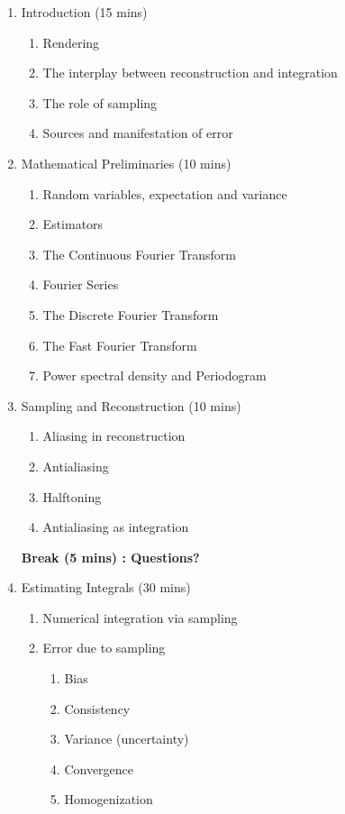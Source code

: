 %
%

\begin{enumerate}
	\item Introduction (15 mins)
	\begin{enumerate}
	\itemsep-0.4em	
		\item Rendering
		\item The interplay between reconstruction and integration
		\item The role of sampling
		\item Sources and manifestation of error
	\end{enumerate}
	\item Mathematical Preliminaries (10 mins) 
	\begin{enumerate}
	\itemsep-0.4em	
		\item Random variables, expectation and variance
		\item Estimators
		\item The Continuous Fourier Transform
		\item Fourier Series
		\item The Discrete Fourier Transform
		\item The Fast Fourier Transform
		\item Power spectral density and Periodogram
	\end{enumerate}
	\item Sampling and Reconstruction (10 mins)
	\begin{enumerate}
	\itemsep-0.4em
		\item Aliasing in reconstruction
		\item Antialiasing
		\item Halftoning
		\item Antialiasing as integration
	\end{enumerate}
	\textbf{Break (5 mins) : Questions?}
	\item Estimating Integrals (30 mins) 
	\begin{enumerate}
	\itemsep-0.4em
		\item Numerical integration via sampling
		\item Error due to sampling
		\begin{enumerate}
		\itemsep-0.6em
			\item Bias
			\item Consistency
			\item Variance (uncertainty)
			\item Convergence
			\item Homogenization

\end{enumerate}
\end{enumerate}
\end{enumerate}
